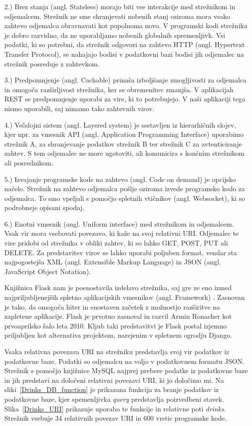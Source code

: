 \documentclass[a4paper, 12pt]{book}
\begin{document}
2.) Brez stanja (angl. Stateless) morajo biti vse interakcije med strežnikom in odjemalcem. Strežnik ne sme shranjevati nobenih stanj oziroma mora vsako zahtevo odjemalca obravnavati kot popolnoma novo. V programski kodi strežnika je dobro razvidno, da ne uporabljamo nobenih globalnih spremenljivk. Vsi podatki, ki so potrebni, da strežnik odgovori na zahtevo HTTP (angl. Hypertext Transfer Protocol), se nahajajo bodisi v podatkovni bazi bodisi jih odjemalec na strežnik posreduje z zahtevkom.

3.) Predpomnjenje (angl. Cachable) prinaša izboljšanje zmogljivosti za odjemalca in omogoča razširljivost strežnika, ker se obremenitev zmanjša. V aplikacijah REST se predpomnjenje uporabi za vire, ki to potrebujejo. V naši aplikaciji tega nismo uporabili, saj nimamo tako zahtevnih virov.

4.) Večslojni sistem (angl. Layered system) je sestavljen iz hierarhičnih slojev, kjer npr. za vmesnik API (angl. Application Programming Interface) uporabimo strežnik A, za shranjevanje podatkov strežnik B ter strežnik C za avtenticiranje zahtev. S tem odjemalec ne more ugotoviti, ali komunicira s končnim strežnikom ali posrednikom.

5.) Izvajanje programske kode na zahtevo (angl. Code on demand) je opcijsko načelo. Strežnik na zahtevo odjemalca pošlje oziroma izvede programsko kodo za odjemalca. To smo vpeljali s pomočjo spletnih vtičnikov (angl. Websocket), ki so podrobneje opisani spodaj.

6.) Enotni vmesnik (angl. Uniform interface) med strežnikom in odjemalcem. Vsak vir mora vsebovati povezavo, ki kaže na svoj relativni URI. Odjemalec te vire pridobi od strežnika v obliki zahtev, ki so lahko GET, POST, PUT ali DELETE. Za predstavitev virov se lahko uporabi poljuben format, vendar sta najpogostejša XML (angl. Extensible Markup Language) in JSON (angl. JavaScript Object Notation).

Knjižnica Flask nam je poenostavila izdelavo strežnika, saj gre ze eno izmed najpriljubljenejših spletno aplikacijskih vmesnikov (angl. Framework) \cite{Flask}. Zasnovan je tako, da omogoča hiter in enostaven začetek z možnostjo razširitve na zapletene aplikacije. Flask je prvotno zasnoval in razvil Armin Ronacher kot prvoaprilsko šalo leta 2010. Kljub taki predstavitvi je Flask postal izjemno priljubljen kot alternativa projektom, narejenim v spletnem ogrodju Django.

Vsaka relativna povezava URI na strežniku predstavlja svoj vir podatkov iz podatkovne baze. Podatki so odjemalcu na voljo v podatkovnem formatu JSON. Strežnik s pomočjo knjižnice MySQL najprej prebere podatke iz podatkovne baze in jih predstavi na določeni relativni povezavi URI, ki jo določimo mi. Na sliki~\ref{Drinks_DB_function} je prikazana funkcija za branje podatkov iz podatkovne baze, kjer spemenljivka \textit{query} predstavlja poizvedbeni stavek. Slika~\ref{Drinks_URI} prikazuje uporabo te funkcije in relativne poti \textit{drinks}. Strežnik vsebuje 34 relativnih povezav URI in 600 vrstic programske kode.
\end{document}
